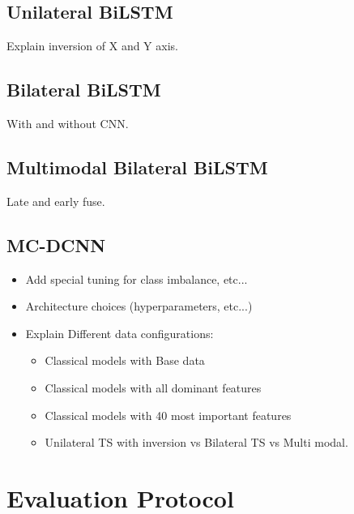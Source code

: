 \subsection{Unilateral BiLSTM}\label{subsec:method-deep-learning}
Explain inversion of X and Y axis.
\subsection{Bilateral BiLSTM}\label{subsec:method-deep-learning}
With and without CNN.
\subsection{Multimodal Bilateral BiLSTM}\label{subsec:method-deep-learning}
Late and early fuse.
\subsection{MC-DCNN}\label{subsec:method-deep-learning}

\begin{itemize}
    \item Add special tuning for class imbalance, etc...
    \item Architecture choices (hyperparameters, etc...)
    \item Explain Different data configurations:
    \begin{itemize}
        \item Classical models with Base data
        \item Classical models with all dominant features
        \item Classical models with 40 most important features
        \item Unilateral TS with inversion vs Bilateral TS vs Multi modal.
    \end{itemize}
\end{itemize}

\section{Evaluation Protocol}\label{sec:method-evaluation-protocol}


